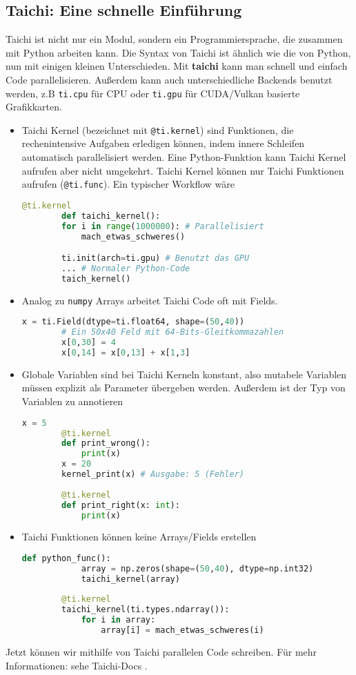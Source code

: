 \documentclass{article}
\begin{document}
\subsection{Taichi: Eine schnelle Einführung}
Taichi ist nicht nur ein Modul, sondern ein Programmiersprache, die zusammen mit Python arbeiten kann. Die Syntax von Taichi ist ähnlich wie die von Python, nun mit einigen kleinen Unterschieden.
Mit \textbf{taichi} kann man schnell und einfach Code parallelisieren. Außerdem kann auch unterschiedliche Backends benutzt werden, z.B \lstinline|ti.cpu| für CPU oder \lstinline|ti.gpu| für CUDA/Vulkan basierte Grafikkarten. 
\begin{itemize}
	\item Taichi Kernel (bezeichnet mit \lstinline|@ti.kernel|) sind Funktionen, die rechenintensive Aufgaben erledigen können, indem innere Schleifen automatisch parallelisiert werden. Eine Python-Funktion kann Taichi Kernel aufrufen aber nicht umgekehrt. Taichi Kernel können nur Taichi Funktionen aufrufen (\lstinline|@ti.func|). Ein typischer Workflow wäre
	\begin{lstlisting}[language=python]
		@ti.kernel
		def taichi_kernel():
		for i in range(1000000): # Parallelisiert
			mach_etwas_schweres()

		ti.init(arch=ti.gpu) # Benutzt das GPU 
		... # Normaler Python-Code
		taich_kernel() 
	\end{lstlisting}

	\item Analog zu \lstinline|numpy| Arrays arbeitet Taichi Code oft mit Fields.	
	\begin{lstlisting}[language=python]
		x = ti.Field(dtype=ti.float64, shape=(50,40))
		# Ein 50x40 Feld mit 64-Bits-Gleitkommazahlen
		x[0,30] = 4
		x[0,14] = x[0,13] + x[1,3]
	\end{lstlisting}
	
	\item Globale Variablen sind bei Taichi Kerneln konstant, also mutabele Variablen müssen explizit als Parameter übergeben werden. Außerdem ist der Typ von Variablen zu annotieren
		\begin{lstlisting}[language=python]
		x = 5
		@ti.kernel
		def print_wrong():
			print(x)
		x = 20
		kernel_print(x) # Ausgabe: 5 (Fehler)
		
		@ti.kernel
		def print_right(x: int):
			print(x)
	\end{lstlisting}
	
	\item Taichi Funktionen können keine Arrays/Fields erstellen
		\begin{lstlisting}[language=python]
		def python_func():
			array = np.zeros(shape=(50,40), dtype=np.int32)
			taichi_kernel(array)
		
		@ti.kernel
		taichi_kernel(ti.types.ndarray()):
			for i in array:
				array[i] = mach_etwas_schweres(i)
	\end{lstlisting}
\end{itemize}
Jetzt können wir mithilfe von Taichi parallelen Code schreiben. Für mehr Informationen: sehe Taichi-Docs \cite{taichi}.
\printbibliography
\end{document}
